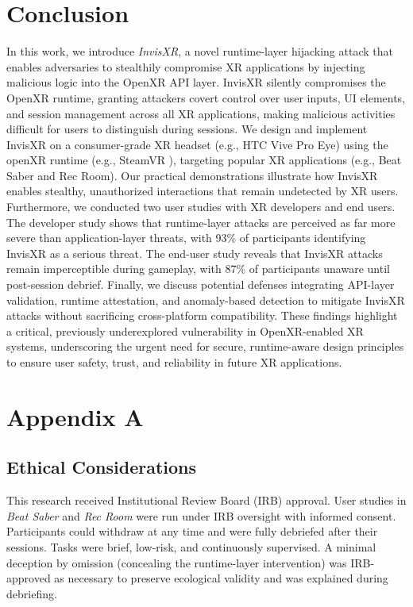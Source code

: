 \documentclass[letterpaper,twocolumn,10pt]{article}
\begin{document}
\section{Conclusion}
In this work, we introduce \textit{InvisXR}, a novel runtime-layer hijacking attack that enables adversaries to stealthily compromise XR applications by injecting malicious logic into the OpenXR API layer. InvisXR silently compromises the OpenXR runtime, granting attackers covert control over user inputs, UI elements, and session management across all XR applications, making malicious activities difficult for users to distinguish during sessions. We design and implement InvisXR on a consumer-grade XR headset (e.g., HTC Vive Pro Eye) using the openXR runtime (e.g., SteamVR ), targeting popular XR applications (e.g., Beat Saber and Rec Room). Our practical demonstrations illustrate how InvisXR enables stealthy, unauthorized interactions that remain undetected by XR users. Furthermore, we conducted two user studies with XR developers and end users. The developer study shows that runtime-layer attacks are perceived as far more severe than application-layer threats, with 93\% of participants identifying InvisXR as a serious threat. The end-user study reveals that InvisXR attacks remain imperceptible during gameplay, with 87\% of participants unaware until post-session debrief. Finally, we discuss potential defenses integrating API-layer validation, runtime attestation, and anomaly-based detection to mitigate InvisXR attacks without sacrificing cross-platform compatibility. These findings highlight a critical, previously underexplored vulnerability in OpenXR-enabled XR systems, underscoring the urgent need for secure, runtime-aware design principles to ensure user safety, trust, and reliability in future XR applications.


\section{Appendix A}
\subsection{Ethical Considerations}
\label{app:ethicalconsiderations}
This research received Institutional Review Board (IRB) approval. User studies in \textit{Beat Saber} and \textit{Rec Room} were run under IRB oversight with informed consent. Participants could withdraw at any time and were fully debriefed after their sessions. Tasks were brief, low-risk, and continuously supervised. A minimal deception by omission (concealing the runtime-layer intervention) was IRB-approved as necessary to preserve ecological validity and was explained during debriefing.
\end{document}
